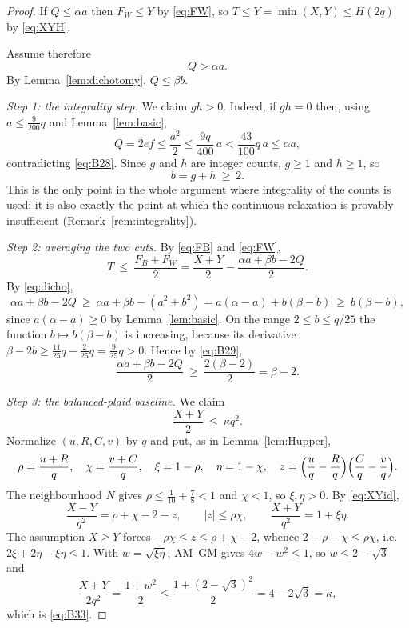 \documentclass[11pt]{amsart}
\theoremstyle{definition}
\theoremstyle{remark}
\begin{document}
\begin{proof}
If $Q\le\alpha a$ then $F_W\le Y$ by \eqref{eq:FW}, so $T\le Y=\min(X,Y)\le H(2q)$ by \eqref{eq:XYH}.

Assume therefore
\begin{equation}\label{eq:B28}
Q>\alpha a .
\end{equation}
By Lemma~\ref{lem:dichotomy}, $Q\le\beta b$.

\emph{Step 1: the integrality step.} We claim $gh>0$. Indeed, if $gh=0$ then, using $a\le\frac{9}{200}q$ and Lemma~\ref{lem:basic},
\[
Q=2ef\le\frac{a^2}{2}\le\frac{9q}{400}\,a<\frac{43}{100}q\,a\le\alpha a ,
\]
contradicting \eqref{eq:B28}. Since $g$ and $h$ are integer counts, $g\ge1$ and $h\ge1$, so
\begin{equation}\label{eq:B29}
b=g+h\ \ge\ 2 .
\end{equation}
This is the only point in the whole argument where integrality of the counts is used; it is also exactly the point at which the continuous relaxation is provably insufficient (Remark~\ref{rem:integrality}).

\emph{Step 2: averaging the two cuts.} By \eqref{eq:FB} and \eqref{eq:FW},
\begin{equation}\label{eq:B30}
T\ \le\ \frac{F_B+F_W}{2}=\frac{X+Y}{2}-\frac{\alpha a+\beta b-2Q}{2}.
\end{equation}
By \eqref{eq:dicho},
\begin{equation}\label{eq:B31}
\alpha a+\beta b-2Q\ \ge\ \alpha a+\beta b-(a^2+b^2)=a(\alpha-a)+b(\beta-b)\ \ge\ b(\beta-b),
\end{equation}
since $a(\alpha-a)\ge0$ by Lemma~\ref{lem:basic}. On the range $2\le b\le q/25$ the function $b\mapsto b(\beta-b)$ is increasing, because its derivative $\beta-2b\ge\frac{11}{25}q-\frac{2}{25}q=\frac9{25}q>0$. Hence by \eqref{eq:B29},
\begin{equation}\label{eq:B32}
\frac{\alpha a+\beta b-2Q}{2}\ \ge\ \frac{2(\beta-2)}{2}=\beta-2 .
\end{equation}

\emph{Step 3: the balanced-plaid baseline.} We claim
\begin{equation}\label{eq:B33}
\frac{X+Y}{2}\ \le\ \kappa q^2 .
\end{equation}
Normalize $(u,R,C,v)$ by $q$ and put, as in Lemma~\ref{lem:Hupper},
\[
\rho=\frac{u+R}{q},\quad \chi=\frac{v+C}{q},\quad \xi=1-\rho,\quad \eta=1-\chi,\quad
z=\Bigl(\frac uq-\frac Rq\Bigr)\Bigl(\frac Cq-\frac vq\Bigr).
\]
The neighbourhood $N$ gives $\rho\le\frac1{10}+\frac78<1$ and $\chi<1$, so $\xi,\eta>0$. By \eqref{eq:XYid},
\[
\frac{X-Y}{q^2}=\rho+\chi-2-z,\qquad |z|\le\rho\chi,\qquad \frac{X+Y}{q^2}=1+\xi\eta .
\]
The assumption $X\ge Y$ forces $-\rho\chi\le z\le\rho+\chi-2$, whence $2-\rho-\chi\le\rho\chi$, i.e.\ $2\xi+2\eta-\xi\eta\le1$. With $w=\sqrt{\xi\eta}$, AM--GM gives $4w-w^2\le1$, so $w\le2-\sqrt3$ and
\[
\frac{X+Y}{2q^2}=\frac{1+w^2}{2}\le\frac{1+(2-\sqrt3)^2}{2}=4-2\sqrt3=\kappa ,
\]
which is \eqref{eq:B33}.


\end{proof}
\end{document}
